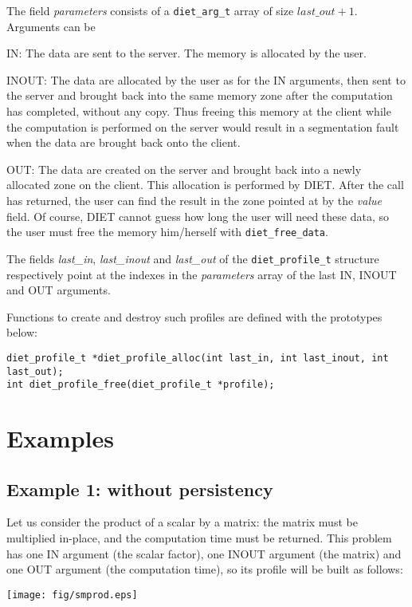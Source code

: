 The field \emph{parameters} consists of a \texttt{diet\_arg\_t} array of size
$last\_out + 1$. Arguments can be
\begin{description}
\item{IN:}    The data are sent to the server. The memory is allocated
  by the user.
\item{INOUT:} The data are allocated by the user as for the IN
  arguments, then sent to the server and brought back into the same memory zone
  after the computation has completed, without any copy. Thus freeing this
  memory at the client while the computation is performed on the
  server would result in a segmentation fault when the data are
  brought back onto the client.
\item{OUT:} The data are created on the server and brought back into a
  newly allocated zone on the client. This allocation is performed by
  DIET. After the call has returned, the user can find the result in
  the zone pointed at by the \emph{value} field. Of course, DIET
  cannot guess how long the user will need these data, so the
  user must free the memory him/herself with \texttt{diet\_free\_data}.
\end{description}


The fields \emph{last\_in}, \emph{last\_inout} and \emph{last\_out} of the
\texttt{diet\_profile\_t} structure respectively point at the indexes in the
\emph{parameters} array of the last IN, INOUT and OUT arguments.

Functions to create and destroy such profiles are defined with the prototypes
below:
{\footnotesize
\begin{verbatim}
diet_profile_t *diet_profile_alloc(int last_in, int last_inout, int last_out);
int diet_profile_free(diet_profile_t *profile);
\end{verbatim}
}



\section{Examples}
\label{sec:pbex}

\subsection{Example 1: without persistency}
Let us consider the product of a scalar by a matrix: the matrix must be
multiplied in-place, and the computation time must be returned.  This
problem has one IN argument (the scalar factor), one INOUT argument (the matrix)
and one OUT argument (the computation time), so its profile will be built as
follows:
\begin{center}
\texttt{[image: fig/smprod.eps]}
\end{center}


